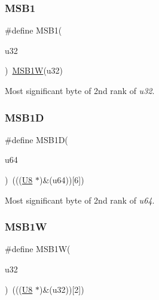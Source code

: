\subsubsection{\texorpdfstring{MSB1}{MSB1}}
{\footnotesize\ttfamily \#define M\+S\+B1(\begin{DoxyParamCaption}\item[{}]{u32 }\end{DoxyParamCaption})~\mbox{\hyperlink{group__group__sam0__utils_ga0f90ecd0b0f0e15608a95b8367b77ece}{M\+S\+B1W}}(u32)}



Most significant byte of 2nd rank of {\itshape u32}. 

\mbox{\label{group__group__sam0__utils_ga97a0ab6790df95cb4d8021d8850487f8}} 
\subsubsection{\texorpdfstring{MSB1D}{MSB1D}}
{\footnotesize\ttfamily \#define M\+S\+B1D(\begin{DoxyParamCaption}\item[{}]{u64 }\end{DoxyParamCaption})~(((\mbox{\hyperlink{group__group__sam0__utils_gaa63ef7b996d5487ce35a5a66601f3e73}{U8}}  $\ast$)\&(u64))\mbox{[}6\mbox{]})}



Most significant byte of 2nd rank of {\itshape u64}. 

\mbox{\label{group__group__sam0__utils_ga0f90ecd0b0f0e15608a95b8367b77ece}} 
\subsubsection{\texorpdfstring{MSB1W}{MSB1W}}
{\footnotesize\ttfamily \#define M\+S\+B1W(\begin{DoxyParamCaption}\item[{}]{u32 }\end{DoxyParamCaption})~(((\mbox{\hyperlink{group__group__sam0__utils_gaa63ef7b996d5487ce35a5a66601f3e73}{U8}}  $\ast$)\&(u32))\mbox{[}2\mbox{]})}



